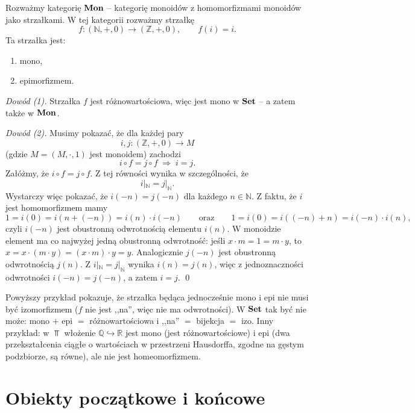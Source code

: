 \begin{przyklad}
Rozważmy kategorię $\mathbf{Mon}$ -- kategorię monoidów z homomorfizmami monoidów jako strzałkami. W tej kategorii rozważmy strzałkę
\[
f\colon (\mathbb{N},+,0) \longrightarrow (\mathbb{Z},+,0), \qquad f(i) = i.
\]
Ta strzałka jest:
\begin{enumerate}
\item mono,
\item epimorfizmem.
\end{enumerate}

\emph{Dowód (1).} Strzałka $f$ jest różnowartościowa, więc jest mono w $\mathbf{Set}$ -- a zatem także w $\mathbf{Mon}$.

\emph{Dowód (2).} Musimy pokazać, że dla każdej pary
\[
i,j\colon (\mathbb{Z},+,0) \longrightarrow M
\]
(gdzie $M=(M,\cdot,1)$ jest monoidem) zachodzi
\[
i\circ f = j\circ f \;\Longrightarrow\; i=j.
\]
Załóżmy, że $i\circ f = j\circ f$. Z tej równości wynika w szczególności, że
\[
i|_{\mathbb{N}} = j|_{\mathbb{N}}.
\]
Wystarczy więc pokazać, że $i(-n) = j(-n)$ dla każdego $n\in\mathbb{N}$. Z faktu, że $i$ jest homomorfizmem mamy
\[
1 = i(0) = i(n + (-n)) = i(n)\cdot i(-n)
\qquad\text{oraz}\qquad
1 = i(0) = i((-n) + n) = i(-n)\cdot i(n),
\]
czyli $i(-n)$ jest obustronną odwrotnością elementu $i(n)$. W monoidzie element ma co najwyżej jedną obustronną odwrotność: jeśli $x\cdot m = 1 = m\cdot y$, to $x = x\cdot(m\cdot y) = (x\cdot m)\cdot y = y$. Analogicznie $j(-n)$ jest obustronną odwrotnością $j(n)$. Z $i|_{\mathbb{N}}=j|_{\mathbb{N}}$ wynika $i(n)=j(n)$, więc z jednoznaczności odwrotności $i(-n) = j(-n)$, a zatem $i=j$. \qed
\end{przyklad}

\begin{uwaga}
Powyższy przykład pokazuje, że strzałka będąca jednocześnie mono i epi nie musi być izomorfizmem ($f$ nie jest ,,na'', więc nie ma odwrotności). W $\mathbf{Set}$ tak być nie może: mono $+$ epi $=$ różnowartościowa i ,,na'' $=$ bijekcja $=$ izo. Inny przykład: w $\Top$ włożenie $\mathbb{Q} \hookrightarrow \mathbb{R}$ jest mono (jest różnowartościowe) i epi (dwa przekształcenia ciągłe o wartościach w przestrzeni Hausdorffa, zgodne na gęstym podzbiorze, są równe), ale nie jest homeomorfizmem.
\end{uwaga}

\section{Obiekty początkowe i końcowe}

